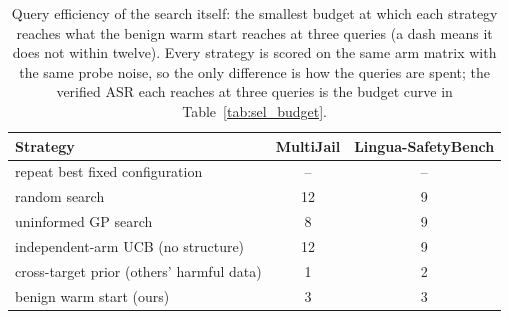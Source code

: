 \begin{table}[t]
\centering
\small
\caption{Query efficiency of the search itself: the smallest budget at which each strategy reaches what the benign warm start reaches at three queries (a dash means it does not within twelve). Every strategy is scored on the same arm matrix with the same probe noise, so the only difference is how the queries are spent; the verified ASR each reaches at three queries is the budget curve in Table~\ref{tab:sel_budget}.}
\label{tab:sel_queryeff}
\begin{tabular}{lcc}
\toprule
Strategy & MultiJail & Lingua-SafetyBench \\
\midrule
repeat best fixed configuration & -- & -- \\
random search & 12 & 9 \\
uninformed GP search & 8 & 9 \\
independent-arm UCB (no structure) & 12 & 9 \\
cross-target prior (others' harmful data) & 1 & 2 \\
benign warm start (ours) & 3 & 3 \\
\bottomrule
\end{tabular}
\end{table}
